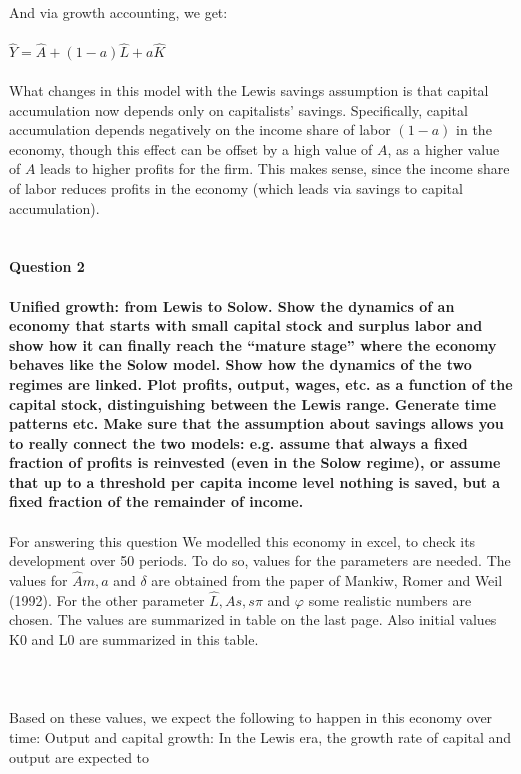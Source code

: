 \documentclass[10pnt]{article}
\begin{document}
	And via growth accounting, we get:
	\\
	\\
	$\widehat{Y}=\widehat{A}+(1-a)\widehat{L}+a\widehat{K}$
	\\
	\\
	What changes in this model with the Lewis savings assumption is that capital accumulation now depends only on capitalists’ savings. Specifically, capital accumulation depends negatively on the income share of labor $(1-a)$ in the economy, though this effect can be offset by a high value of $A$, as a higher value of $A$ leads to higher profits for the firm. This makes sense, since the income share of labor reduces profits in the economy (which leads via savings to capital accumulation). 
	\\ 
	\\
	\\
	\textbf{Question 2}
	\\
	\\
	\textbf{Unified growth: from Lewis to Solow. Show the dynamics of an economy that starts with small capital stock and surplus labor and show how it can finally reach the “mature stage” where the economy behaves like the Solow model. Show how the dynamics of the two regimes are linked. Plot profits, output, wages, etc. as a function of the capital stock, distinguishing between the Lewis range. Generate time patterns etc. Make sure that the assumption about savings allows you to really connect the two models: e.g. assume that always a fixed fraction of profits is reinvested (even in the Solow regime), or assume that up to a threshold per capita income level nothing is saved, but a fixed fraction of the remainder of income.} 
	\\
	\\
	For answering this question 
	We modelled this economy in excel, to check its development over 50 periods. To do so, values for the parameters are needed. The values for $\widehat{A}m, a$ and $\delta$ are obtained from the paper of Mankiw, Romer and Weil (1992). For the other parameter $\widehat{L}, As, s\pi$ and $\varphi$ some realistic numbers are chosen. The values are summarized in table on the last page. Also initial values K0 and L0 are summarized in this table.
	\\
\\
\\
\\
	Based on these values, we expect the following to happen in this economy over time: Output and capital growth: In the Lewis era, the growth rate of capital and output are expected to 
\end{document}
